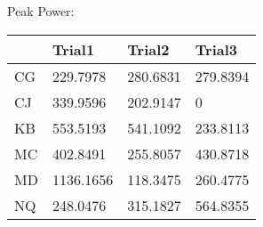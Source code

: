 \documentclass[preview]{standalone}
\begin{document}
Peak Power:
\begin{tabular}{llll}
    & Trial1 & Trial2 & Trial3 \\ 
    \hline 
    CG & 229.7978 & 280.6831 & 279.8394 \\ 
    CJ & 339.9596 & 202.9147 & 0 \\ 
    KB & 553.5193 & 541.1092 & 233.8113 \\ 
    MC & 402.8491 & 255.8057 & 430.8718 \\ 
    MD & 1136.1656 & 118.3475 & 260.4775 \\ 
    NQ & 248.0476 & 315.1827 & 564.8355 \\ 
    \hline 
\end{tabular}
\end{document}
